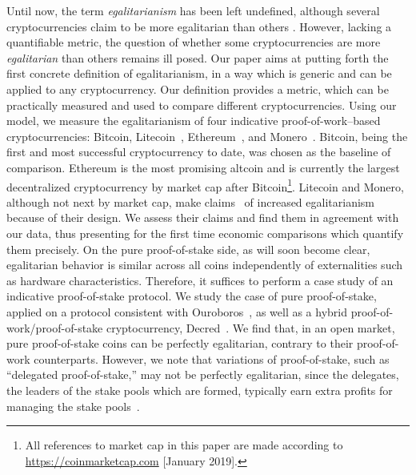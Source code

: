 Until now, the term \emph{egalitarianism} has been left undefined, although
several cryptocurrencies claim to be more egalitarian than others \cite{van2013cryptonote} \cite{mcmillan2013}. However,
lacking a quantifiable metric, the question of whether some cryptocurrencies are
more \emph{egalitarian} than others remains ill posed. Our paper aims at
putting forth the first concrete definition of egalitarianism, in a way which is
generic and can be applied to any cryptocurrency.
Our definition provides a metric, which can be practically measured and used
to compare different cryptocurrencies.
Using our model, we measure the egalitarianism of
four indicative proof-of-work--based
cryptocurrencies: Bitcoin, Litecoin~\cite{lee2011litecoin}, Ethereum~\cite{buterin,wood2014ethereum}, and Monero~\cite{van2013cryptonote}. Bitcoin, being the first and most successful cryptocurrency to date, was chosen as
the baseline of comparison. Ethereum is the most promising altcoin and is currently the largest decentralized cryptocurrency by market cap after Bitcoin\footnote{All references to market cap in this paper are made according to \url{https://coinmarketcap.com} [January 2019].}.
Litecoin and Monero, although not next by market cap,
make claims~\cite{van2013cryptonote,mcmillan2013} of increased egalitarianism because of their design.
We assess their claims and find them in agreement with our data, thus presenting for the first time economic comparisons which quantify them precisely.
On the pure proof-of-stake side, as will soon become clear, egalitarian
behavior is similar across all coins independently of externalities such as hardware characteristics. Therefore,
it suffices to perform a case study of an indicative proof-of-stake protocol.
We study the case of pure proof-of-stake, applied on a protocol consistent with Ouroboros~\cite{C:KRDO17},
as well as a hybrid proof-of-work/proof-of-stake cryptocurrency,
Decred~\cite{decred}.
We find that, in an open market, pure proof-of-stake coins can be perfectly
egalitarian, contrary to their proof-of-work counterparts. However, we
note that variations of proof-of-stake, such as ``delegated proof-of-stake,''
may not be perfectly egalitarian, since the delegates, \ie the leaders of
the stake pools which are formed, typically earn extra profits for managing the
stake pools~\cite{bkks2018}.

